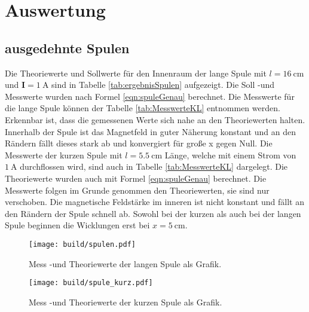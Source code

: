 \newpage
\section{Auswertung}
\label{sec:Auswertung}
\subsection{ausgedehnte Spulen}
Die Theoriewerte und Sollwerte für den Innenraum der lange Spule mit
$l = \SI{16}{\centi\meter}$ und $\symbf{I} = \SI{1}{\ampere}$ sind in
Tabelle \ref{tab:ergebnisSpulen} aufgezeigt. Die Soll -und Messwerte
wurden nach Formel \eqref{eqn:spuleGenau} berechnet.
Die Messwerte für die lange Spule können der Tabelle \ref{tab:MesswerteKL}
entnommen werden. Erkennbar ist, dass die gemessenen Werte sich nahe an den
Theoriewerten halten. Innerhalb der Spule ist das Magnetfeld in guter Näherung
konstant und an den Rändern fällt dieses stark ab und konvergiert für große x
gegen Null.
Die Messwerte der kurzen Spule mit $l = \SI{5.5}{\centi\meter}$ Länge, welche
mit einem Strom von $\SI{1}{\ampere}$ durchflossen wird, sind auch in Tabelle
\ref{tab:MesswerteKL} dargelegt. Die Theoriewerte wurden auch mit Formel
\eqref{eqn:spuleGenau} berechnet.
Die Messwerte folgen im Grunde genommen den Theoriewerten, sie sind nur
verschoben.
Die magnetische Feldstärke im inneren ist nicht konstant und fällt an den
Rändern der Spule schnell ab.
Sowohl bei der kurzen als auch bei der langen Spule beginnen die Wicklungen erst bei
$x = \SI{5}{\centi\meter}$.
\begin{figure}
  \texttt{[image: build/spulen.pdf]}
  \caption{Mess -und Theoriewerte der langen Spule als Grafik.}
  \label{fig:spuleL}
\end{figure}

\begin{figure}
  \texttt{[image: build/spule\_kurz.pdf]}
  \caption{Mess -und Theoriewerte der kurzen Spule als Grafik.}
  \label{fig:spuleK}
\end{figure}

